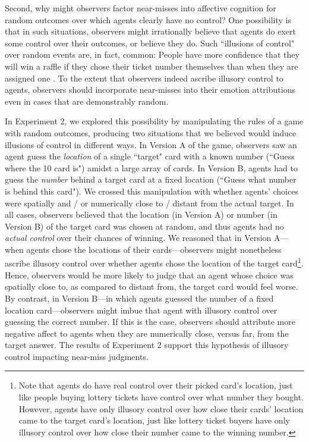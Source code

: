 \documentclass[10pt,letterpaper]{article}
\begin{document}
	Second, why might observers factor near-misses into affective cognition for random outcomes over which agents clearly have no control? One possibility is that in such situations, observers might irrationally believe that agents do exert some control over their outcomes, or believe they do.  Such ``illusions of control" over random events are, in fact, common: People have more confidence that they will win a raffle if they chose their ticket number themselves than when they are assigned one \cite{Langer1975, Taylor1988}. To the extent that observers indeed ascribe illusory control to agents, observers should incorporate near-misses into their emotion attributions even in cases that are demonstrably random.  

	
	In Experiment 2, we explored this possibility by manipulating the rules of a game with random outcomes, producing two situations that we believed would induce illusions of control in different ways. In Version A of the game, observers saw an agent guess the \textit{location} of a single ``target" card with a known number (``Guess where the 10 card is") amidst a large array of cards. In Version B, agents had to guess the \textit{number} behind a target card at a fixed location (``Guess what number is behind this card"). We crossed this manipulation with whether agents' choices were spatially and / or numerically close to / distant from the actual target. In all cases, observers believed that the location (in Version A) or number (in Version B) of the target card was chosen at random, and thus agents had no \textit{actual control} over their chances of winning. We reasoned that in Version A---when agents chose the locations of their cards---observers might nonetheless ascribe illusory control over whether agents chose the location of the target card\footnote{Note that agents do have real control over their picked card's location, just like people buying lottery tickets have control over what number they bought. However, agents have only illusory control over how close their cards' location came to the target card's location, just like lottery ticket buyers have only illusory control over how close their number came to the winning number.}. Hence, observers would be more likely to judge that an agent whose choice was spatially close to, as compared to distant from, the target card would feel worse.  By contrast, in Version B---in which agents guessed the number of a fixed location card---observers might imbue that agent with illusory control over guessing the correct number. If this is the case, observers should attribute more negative affect to agents when they are numerically close, versus far, from the target answer. The results of Experiment 2 support this hypothesis of illusory control impacting near-miss judgments.
\end{document}
